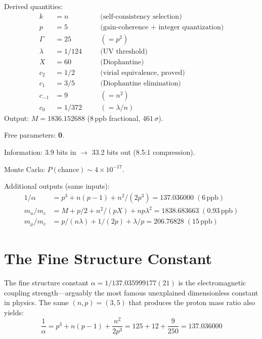 \documentclass[12pt,a4paper]{article}
\theoremstyle{definition}
\newcommand{\ppb}{\,\mathrm{ppb}}
\begin{document}
\noindent
Derived quantities:
\begin{align*}
  k &= n &\quad& \text{(self-consistency selection)} \\
  p &= 5 && \text{(gain-coherence $+$ integer quantization)} \\
  \Gamma &= 25 && (= p^2) \\
  \lambda &= 1/124 && \text{(UV threshold)} \\
  X &= 60 && \text{(Diophantine)} \\
  c_2 &= 1/2 && \text{(virial equivalence, proved)} \\
  c_1 &= 3/5 && \text{(Diophantine elimination)} \\
  c_{-1} &= 9 && (= n^2) \\
  c_0 &= 1/372 && (= \lambda/n)
\end{align*}
Output: $M = 1836.152688$ ($8\ppb$ fractional, $461\,\sigma$).

Free parameters: \textbf{0}.

Information: 3.9 bits in $\to$ 33.2 bits out (8.5:1 compression).

Monte Carlo: $P(\mathrm{chance}) \sim 4 \times 10^{-17}$.

Additional outputs (same inputs):
\begin{align*}
  1/\alpha &= p^3 + n(p-1) + n^2/(2p^3) = 137.036000 \;(6\ppb) \\
  m_n/m_e &= M + p/2 + n^2/(pX) + np\lambda^2 = 1838.683663 \;(0.93\ppb) \\
  m_\mu/m_e &= p/(n\lambda) + 1/(2p) + \lambda/p = 206.76828 \;(15\ppb)
\end{align*}

\section{The Fine Structure Constant}

The fine structure constant $\alpha = 1/137.035999177(21)$ is the
electromagnetic coupling strength---arguably the most famous unexplained
dimensionless constant in physics. The same $(n, p) = (3, 5)$ that
produces the proton mass ratio also yields:
\begin{equation}\label{eq:alpha}
  \frac{1}{\alpha} = p^3 + n(p-1) + \frac{n^2}{2p^3}
    = 125 + 12 + \frac{9}{250} = 137.036000
\end{equation}
\end{document}
